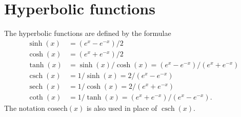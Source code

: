 \documentclass[a4paper]{book}
\newcommand{\csch}     {\operatorname{csch}}
\newcommand{\sech}     {\operatorname{sech}}
\renewcommand{\:}{\colon}
\theoremstyle{definition}
\begin{document}
\section{Hyperbolic functions}
\label{sec-hyp}

The hyperbolic functions are defined by the formulae
\begin{align*}
 \sinh(x) &= (e^x - e^{-x})/2 \\
 \cosh(x) &= (e^x + e^{-x})/2 \\
 \tanh(x) &= \sinh(x)/\cosh(x) = (e^x-e^{-x})/(e^x+e^{-x}) \\
 \csch(x) &= 1/\sinh(x) = 2/(e^x-e^{-x}) \\
 \sech(x) &= 1/\cosh(x) = 2/(e^x+e^{-x}) \\
 \coth(x) &= 1/\tanh(x) = (e^x+e^{-x})/(e^x-e^{-x}).
\end{align*}
The notation $\text{cosech}(x)$ is also used in place of $\csch(x)$.
\end{document}
